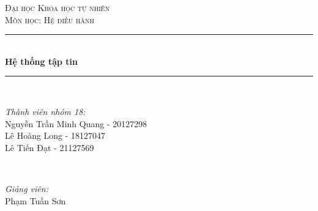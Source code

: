 \begin{titlepage}

\newcommand{\HRule}{\rule{\linewidth}{0.5mm}} %

\center %
 

\textsc{\LARGE Đại học Khoa học tự nhiên}\\[1.0cm] %
\textsc{\large Môn học: Hệ điều hành }\\[0.5cm] %


\HRule \\[0.4cm]
{ \huge \bfseries Hệ thống tập tin}\\[0.2cm] %
\HRule \\[1.5cm]
 

\begin{minipage}{0.4\textwidth}
\begin{flushleft} \large
\emph{Thành viên nhóm 18:}\\
{\fontsize{10}{12}\selectfont Nguyễn Trần Minh Quang - 20127298}\\
{\fontsize{10}{12}\selectfont Lê Hoàng Long - 18127047}\\
{\fontsize{10}{12}\selectfont Lê Tiến Đạt - 21127569}\\
\end{flushleft}
\end{minipage}
~
\begin{minipage}{0.4\textwidth}
\begin{flushright} \large
\emph{Giảng viên:} \\
Phạm Tuấn Sơn %
\end{flushright}
\end{minipage}\\[1cm]


\end{titlepage}
